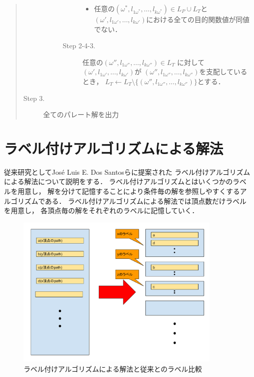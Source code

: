 \documentclass[12pt]{optlab-bachelor}
\begin{document}
\begin{quote}
\begin{description}
\begin{description}
\begin{description}
\begin{itemize}
          \item 任意の$(\omega^*,l_{1\omega^*},\ldots,l_{k\omega^*}) \in L_P \cup L_T$と
          $(\omega',l_{1\omega'},\ldots,l_{k\omega'})$における全ての目的関数値が同値でない．
        \end{itemize}
        \item[Step 2-4-3.] 任意の$(\omega'',l_{1\omega''},\ldots,l_{k\omega''})\in L_T$
        に対して$(\omega',l_{1\omega'},\ldots,l_{k\omega'})$が
        $(\omega'',l_{1\omega''},\ldots,l_{k\omega''})$を支配しているとき，
        $L_T \leftarrow L_T \setminus \{(\omega'',l_{1\omega''},\ldots,l_{k\omega''})\}$とする．
      \end{description}
    \end{description}
    \item[Step 3.] 全てのパレート解を出力
  \end{description}
\end{quote}

%

\section{ラベル付けアルゴリズムによる解法}
従来研究としてJosé Luis E. Dos Santosら\cite{Santos}に提案された
ラベル付けアルゴリズムによる解法について説明をする．
ラベル付けアルゴリズムとはいくつかのラベルを用意し，
解を分けて記憶することにより条件毎の解を参照しやすくするアルゴリズムである．
ラベル付けアルゴリズムによる解法では頂点数だけラベルを用意し，
各頂点毎の解をそれぞれのラベルに記憶していく．

\begin{figure}[htbp]
  \centering
  \caption{ラベル付けアルゴリズムによる解法と従来とのラベル比較}
  \includegraphics[width=10.0cm]{fig/fig2.pdf}
\end{figure}
\end{document}
